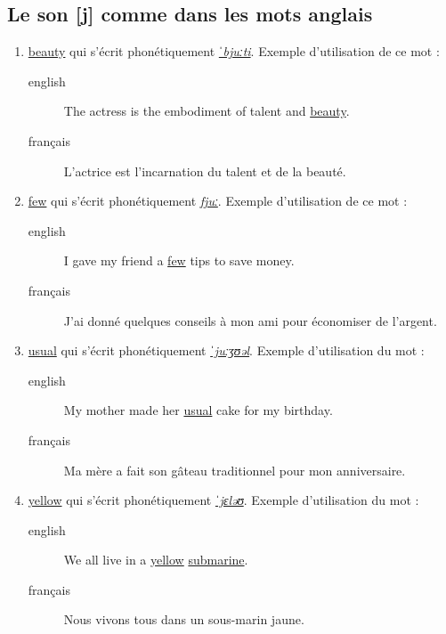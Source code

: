 \documentclass[12pt,a4paper]{book}
\begin{document}
\subsection{Le son [j] comme dans les mots anglais}
\label{sec:orgacfdead}
\begin{enumerate}
\item \href{http://www.wordreference.com/enfr/beauty}{beauty} qui s'écrit phonétiquement \href{https://en.oxforddictionaries.com/definition/beauty}{\emph{ˈbjuːti}}. Exemple d'utilisation
de ce mot :
\begin{description}
\item[{english}] \textenglish{The actress is the embodiment of talent and \href{https://youtu.be/IzwWXNxFiyA}{beauty}.}
\item[{français}] L'actrice est l'incarnation du talent et de la
beauté.
\end{description}
\item \href{http://www.wordreference.com/enfr/few}{few} qui s'écrit phonétiquement \href{https://en.oxforddictionaries.com/definition/few}{\emph{fjuː}}. Exemple d'utilisation de ce
mot : 
\begin{description}
\item[{english}] \textenglish{I gave my friend a \href{https://youtu.be/6E2hYDIFDIU}{few} tips to save money.}
\item[{français}] J'ai donné quelques conseils à mon ami pour
économiser de l'argent.
\end{description}
\item \href{http://www.wordreference.com/enfr/usual}{usual} qui s'écrit phonétiquement \href{https://en.oxforddictionaries.com/definition/usual}{\emph{ˈjuːʒʊəl}}. Exemple d'utilisation
du mot :
\begin{description}
\item[{english}] \textenglish{My mother made her \href{https://youtu.be/ThLRPCs8uzc}{usual} cake for my birthday.}
\item[{français}] Ma mère a fait son gâteau traditionnel pour mon
anniversaire.
\end{description}
\item \href{http://www.wordreference.com/enfr/yellow}{yellow} qui s'écrit phonétiquement \href{https://en.oxforddictionaries.com/definition/yellow}{\emph{ˈjɛləʊ}}. Exemple d'utilisation
du mot :
\begin{description}
\item[{english}] \textenglish{We all live in a \href{https://youtu.be/m2uTFF\_3MaA}{yellow} \href{https://www.lacoccinelle.net/245633.html}{submarine}.}
\item[{français}] Nous vivons tous dans un sous-marin jaune.
\end{description}
\end{enumerate}
\end{document}
